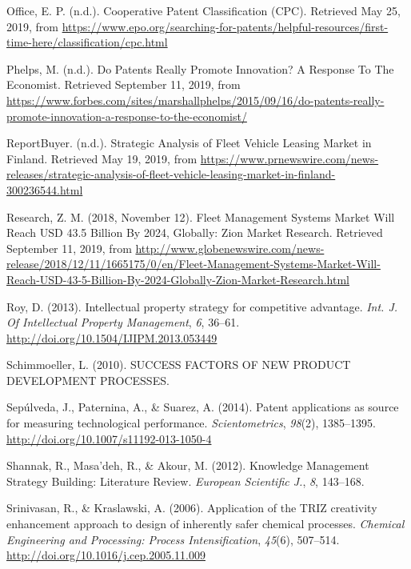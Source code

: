 \documentclass[12pt,twoside]{reedthesis}
\begin{document}
\leavevmode\hypertarget{ref-officeCooperativePatentClassification}{}%
Office, E. P. (n.d.). Cooperative Patent Classification (CPC). Retrieved May 25, 2019, from \url{https://www.epo.org/searching-for-patents/helpful-resources/first-time-here/classification/cpc.html}

\leavevmode\hypertarget{ref-phelpsPatentsReallyPromote}{}%
Phelps, M. (n.d.). Do Patents Really Promote Innovation? A Response To The Economist. Retrieved September 11, 2019, from \url{https://www.forbes.com/sites/marshallphelps/2015/09/16/do-patents-really-promote-innovation-a-response-to-the-economist/}

\leavevmode\hypertarget{ref-reportbuyerStrategicAnalysisFleeta}{}%
ReportBuyer. (n.d.). Strategic Analysis of Fleet Vehicle Leasing Market in Finland. Retrieved May 19, 2019, from \url{https://www.prnewswire.com/news-releases/strategic-analysis-of-fleet-vehicle-leasing-market-in-finland-300236544.html}

\leavevmode\hypertarget{ref-researchFleetManagementSystems2018}{}%
Research, Z. M. (2018, November 12). Fleet Management Systems Market Will Reach USD 43.5 Billion By 2024, Globally: Zion Market Research. Retrieved September 11, 2019, from \url{http://www.globenewswire.com/news-release/2018/12/11/1665175/0/en/Fleet-Management-Systems-Market-Will-Reach-USD-43-5-Billion-By-2024-Globally-Zion-Market-Research.html}

\leavevmode\hypertarget{ref-royIntellectualPropertyStrategy2013}{}%
Roy, D. (2013). Intellectual property strategy for competitive advantage. \emph{Int. J. Of Intellectual Property Management}, \emph{6}, 36--61. \url{http://doi.org/10.1504/IJIPM.2013.053449}

\leavevmode\hypertarget{ref-schimmoellerSUCCESSFACTORSNEW2010}{}%
Schimmoeller, L. (2010). SUCCESS FACTORS OF NEW PRODUCT DEVELOPMENT PROCESSES.

\leavevmode\hypertarget{ref-sepulvedaPatentApplicationsSource2014}{}%
Sepúlveda, J., Paternina, A., \& Suarez, A. (2014). Patent applications as source for measuring technological performance. \emph{Scientometrics}, \emph{98}(2), 1385--1395. \url{http://doi.org/10.1007/s11192-013-1050-4}

\leavevmode\hypertarget{ref-shannakKnowledgeManagementStrategy2012}{}%
Shannak, R., Masa'deh, R., \& Akour, M. (2012). Knowledge Management Strategy Building: Literature Review. \emph{European Scientific J.}, \emph{8}, 143--168.

\leavevmode\hypertarget{ref-srinivasanApplicationTRIZCreativity2006}{}%
Srinivasan, R., \& Kraslawski, A. (2006). Application of the TRIZ creativity enhancement approach to design of inherently safer chemical processes. \emph{Chemical Engineering and Processing: Process Intensification}, \emph{45}(6), 507--514. \url{http://doi.org/10.1016/j.cep.2005.11.009}
\end{document}
